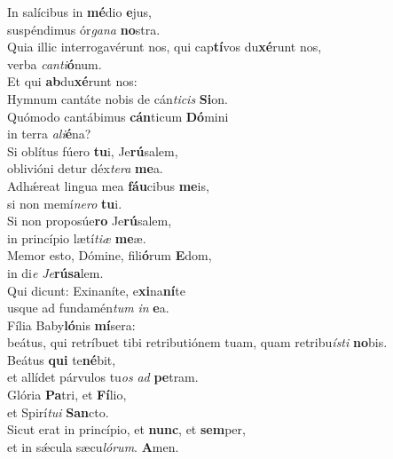 \evenverse In salícibus in \textbf{mé}dio \textbf{e}jus,~\*\\
\evenverse suspéndimus ór\textit{ga}\textit{na} \textbf{no}stra.\\
\oddverse Quia illic interrogavérunt nos, qui cap\textbf{tí}vos du\textbf{xé}runt nos,~\*\\
\oddverse verba \textit{can}\textit{ti}\textbf{ó}num.\\
\evenverse Et qui \textbf{ab}du\textbf{xé}runt nos:~\*\\
\evenverse Hymnum cantáte nobis de cán\textit{ti}\textit{cis} \textbf{Si}on.\\
\oddverse Quómodo cantábimus \textbf{cán}ticum \textbf{Dó}mini~\*\\
\oddverse in terra \textit{a}\textit{li}\textbf{é}na?\\
\evenverse Si oblítus fúero \textbf{tu}i, Je\textbf{rú}salem,~\*\\
\evenverse oblivióni detur déx\textit{te}\textit{ra} \textbf{me}a.\\
\oddverse Adhǽreat lingua mea \textbf{fáu}cibus \textbf{me}is,~\*\\
\oddverse si non memí\textit{ne}\textit{ro} \textbf{tu}i.\\
\evenverse Si non proposúe\textbf{ro} Je\textbf{rú}salem,~\*\\
\evenverse in princípio lætí\textit{ti}\textit{æ} \textbf{me}æ.\\
\oddverse Memor esto, Dómine, fili\textbf{ó}rum \textbf{E}dom,~\*\\
\oddverse in di\textit{e} \textit{Je}\textbf{rú}\textbf{sa}lem.\\
\evenverse Qui dicunt: Exinaníte, e\textbf{xi}na\textbf{ní}te~\*\\
\evenverse usque ad fundamén\textit{tum} \textit{in} \textbf{e}a.\\
\oddverse Fília Baby\textbf{ló}nis \textbf{mí}sera:~\*\\
\oddverse beátus, qui retríbuet tibi retributiónem tuam, quam retribu\textit{í}\textit{sti} \textbf{no}bis.\\
\evenverse Beátus \textbf{qui} te\textbf{né}bit,~\*\\
\evenverse et allídet párvulos tu\textit{os} \textit{ad} \textbf{pe}tram.\\
\oddverse Glória \textbf{Pa}tri, et \textbf{Fí}lio,~\*\\
\oddverse et Spirí\textit{tu}\textit{i} \textbf{San}cto.\\
\evenverse Sicut erat in princípio, et \textbf{nunc}, et \textbf{sem}per,~\*\\
\evenverse et in sǽcula sæcu\textit{ló}\textit{rum}. \textbf{A}men.\\
